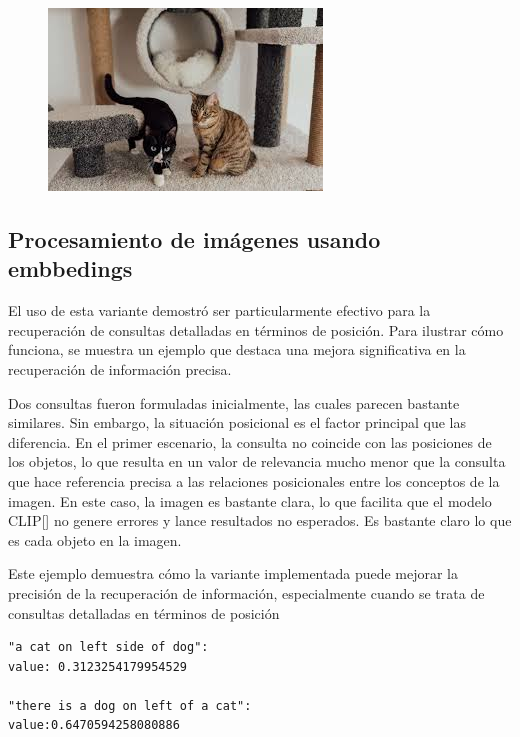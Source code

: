 \begin{figure}
\begin{minipage}{0.3\textwidth}
 \includegraphics[width=\textwidth]{Graphics/Images/image_15.jpg}
 \caption{ }
 \label{fig:15}
\end{minipage}
\end{figure}

\subsection{Procesamiento de im\'agenes usando embbedings}
El uso de esta variante demostró ser particularmente efectivo para la recuperación de consultas detalladas en términos de posición. Para ilustrar cómo funciona, se muestra un ejemplo que destaca una mejora significativa en la recuperación de información precisa.

Dos consultas fueron formuladas inicialmente, las cuales parecen bastante similares. Sin embargo, la situación posicional es el factor principal que las diferencia. En el primer escenario, la consulta no coincide con las posiciones de los objetos, lo que resulta en un valor de relevancia mucho menor que la consulta que hace referencia precisa a las relaciones posicionales entre los conceptos de la imagen. En este caso, la imagen es bastante clara, lo que facilita que el modelo CLIP[\cite{clip}] no genere errores y lance resultados no esperados. Es bastante claro lo que es cada objeto en la imagen.

Este ejemplo demuestra cómo la variante implementada puede mejorar la precisión de la recuperación de información, especialmente cuando se trata de consultas detalladas en términos de posición

\begin{verbatim}
"a cat on left side of dog":
value: 0.3123254179954529

"there is a dog on left of a cat":
value:0.6470594258080886
\end{verbatim}

